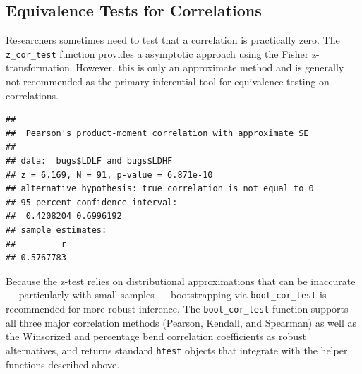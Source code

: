 \documentclass[]{interact}
\theoremstyle{plain}%
\theoremstyle{definition}
\theoremstyle{remark}
\newenvironment{Shaded}{\begin{snugshade}}{\end{snugshade}}
\newcommand{\AttributeTok}[1]{\textcolor[rgb]{0.13,0.29,0.53}{#1}}
\newcommand{\CommentTok}[1]{\textcolor[rgb]{0.56,0.35,0.01}{\textit{#1}}}
\newcommand{\FloatTok}[1]{\textcolor[rgb]{0.00,0.00,0.81}{#1}}
\newcommand{\FunctionTok}[1]{\textcolor[rgb]{0.13,0.29,0.53}{\textbf{#1}}}
\newcommand{\NormalTok}[1]{#1}
\newcommand{\OtherTok}[1]{\textcolor[rgb]{0.56,0.35,0.01}{#1}}
\newcommand{\SpecialCharTok}[1]{\textcolor[rgb]{0.81,0.36,0.00}{\textbf{#1}}}
\newcommand{\StringTok}[1]{\textcolor[rgb]{0.31,0.60,0.02}{#1}}
\begin{document}
\subsection{Equivalence Tests for
Correlations}\label{equivalence-tests-for-correlations}

Researchers sometimes need to test that a correlation is practically
zero. The \texttt{z\_cor\_test} function provides a asymptotic approach
using the Fisher z-transformation. However, this is only an approximate
method and is generally not recommended as the primary inferential tool
for equivalence testing on correlations.

\begin{Shaded}
\end{Shaded}

\begin{verbatim}
## 
##  Pearson's product-moment correlation with approximate SE
## 
## data:  bugs$LDLF and bugs$LDHF
## z = 6.169, N = 91, p-value = 6.871e-10
## alternative hypothesis: true correlation is not equal to 0
## 95 percent confidence interval:
##  0.4208204 0.6996192
## sample estimates:
##         r 
## 0.5767783
\end{verbatim}

Because the z-test relies on distributional approximations that can be
inaccurate --- particularly with small samples --- bootstrapping via
\texttt{boot\_cor\_test} is recommended for more robust inference. The
\texttt{boot\_cor\_test} function supports all three major correlation
methods (Pearson, Kendall, and Spearman) as well as the Winsorized
\citep{Wilcox_1993} and percentage bend \citep{Wilcox_1994} correlation
coefficients as robust alternatives, and returns standard \texttt{htest}
objects that integrate with the helper functions described above.

\begin{Shaded}
\end{Shaded}
\end{document}
